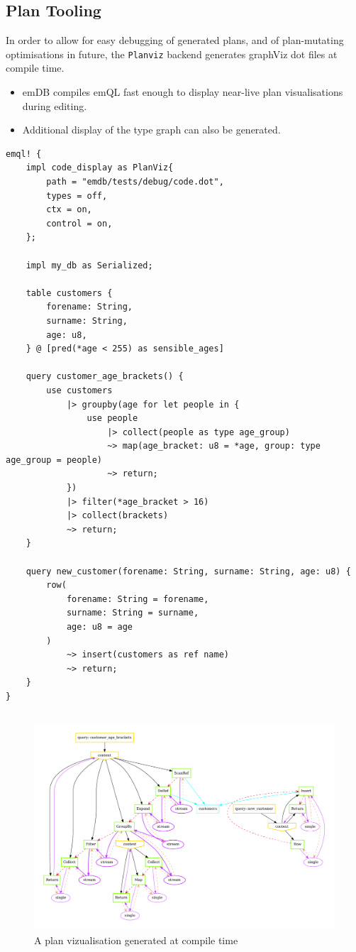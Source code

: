 \subsection{Plan Tooling}
In order to allow for easy debugging of generated plans, and of plan-mutating optimisations in future, the \texttt{Planviz} backend generates graphViz dot files at compile time.
\begin{itemize}
    \setlength\itemsep{0em}
    \item emDB compiles emQL fast enough to display near-live plan visualisations during editing.
    \item Additional display of the type graph can also be generated.
\end{itemize}
\begin{verbatim}
emql! {
    impl code_display as PlanViz{
        path = "emdb/tests/debug/code.dot",
        types = off,
        ctx = on,
        control = on,
    };

    impl my_db as Serialized;
    
    table customers {
        forename: String,
        surname: String,
        age: u8,
    } @ [pred(*age < 255) as sensible_ages]

    query customer_age_brackets() {
        use customers
            |> groupby(age for let people in {
                use people
                    |> collect(people as type age_group)
                    ~> map(age_bracket: u8 = *age, group: type age_group = people)
                    ~> return;
            })
            |> filter(*age_bracket > 16)
            |> collect(brackets)
            ~> return;
    }

    query new_customer(forename: String, surname: String, age: u8) {
        row(
            forename: String = forename,
            surname: String = surname,
            age: u8 = age
        )
            ~> insert(customers as ref name)
            ~> return;
    }
}
\end{verbatim}
\begin{figure}[h!]
    \centering
    \begin{verbatim}
    \end{verbatim}
    \includegraphics[width=\textwidth]{implementation/diagrams/code.pdf}
    \caption{A plan vizualisation generated at compile time}
\end{figure}


